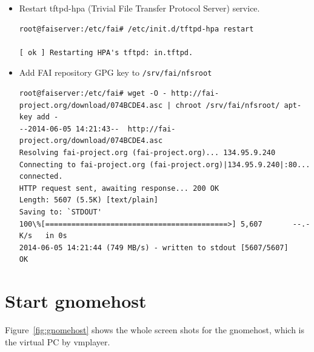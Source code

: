 \documentclass[11pt
  , a4paper
  , article
  , oneside
]{memoir}
\begin{document}
\begin{itemize}
\begin{lstlisting}[emph={nfsroot}, emphstyle=\underbar, style=termstylenumber, caption={Default Boot Parameters}, label={list:default-boot-parameter}]
  # generated by fai-chboot for host demohost with IP 10.1.4.210
  default fai-generated

  label fai-generated
  kernel vmlinuz-3.2.0-4-amd64
  append initrd=initrd.img-3.2.0-4-amd64 ip=dhcp  root=/srv/fai/nfsroot aufs  FAI_FLAGS=verbose,sshd,createvt FAI_CONFIG_SRC=nfs://10.1.4.100/srv/fai/config FAI_ACTION=install (*@\label{nfsroot_v3}@*) 
\end{lstlisting}
Add the \texttt{:vers=3} at the end of \texttt{root=/srv/fai/nfsroot} in the line number~\ref{nfsroot_v3} in Listing~\ref{list:default-boot-parameter}. So it should be 

\begin{lstlisting}[emph={nfsroot, vers}, emphstyle=\underbar]
  root=/srv/fai/nfsroot:vers=3 
\end{lstlisting}
Modify \texttt{/srv/tftp/fai/pxelinux.cfg/0A0104D3} also. 

\item Restart tftpd-hpa (Trivial File Transfer Protocol Server) service. 

\begin{lstlisting}
root@faiserver:/etc/fai# /etc/init.d/tftpd-hpa restart

[ ok ] Restarting HPA's tftpd: in.tftpd.
\end{lstlisting}

\item Add FAI repository GPG key to \texttt{/srv/fai/nfsroot}

\begin{lstlisting}
root@faiserver:/etc/fai# wget -O - http://fai-project.org/download/074BCDE4.asc | chroot /srv/fai/nfsroot/ apt-key add -
--2014-06-05 14:21:43--  http://fai-project.org/download/074BCDE4.asc
Resolving fai-project.org (fai-project.org)... 134.95.9.240
Connecting to fai-project.org (fai-project.org)|134.95.9.240|:80... connected.
HTTP request sent, awaiting response... 200 OK
Length: 5607 (5.5K) [text/plain]
Saving to: `STDOUT'
100\%[==========================================>] 5,607       --.-K/s   in 0s      
2014-06-05 14:21:44 (749 MB/s) - written to stdout [5607/5607]
OK
\end{lstlisting}
\end{itemize}

\section{Start gnomehost}
Figure~\ref{fig:gnomehost} shows the whole screen shots for the gnomehost, which is the virtual PC by vmplayer.
\end{document}
